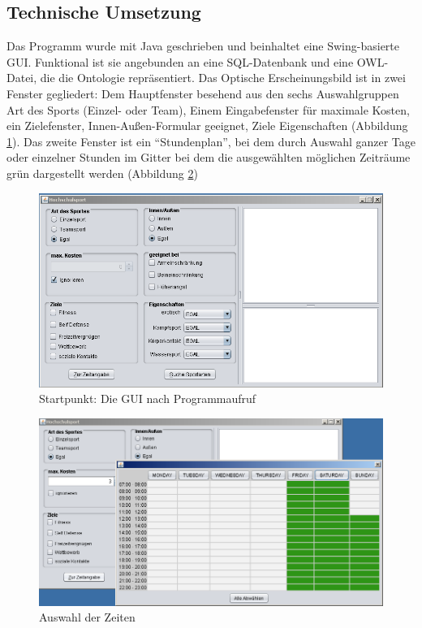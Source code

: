 \subsection{Technische Umsetzung}

Das Programm wurde mit Java geschrieben und beinhaltet eine Swing-basierte GUI. Funktional ist sie angebunden an eine SQL-Datenbank und eine OWL-Datei, die die Ontologie repräsentiert. Das Optische Erscheinungsbild ist in zwei Fenster gegliedert: Dem Hauptfenster besehend aus den sechs Auswahlgruppen Art des Sports (Einzel- oder Team), Einem Eingabefenster für maximale Kosten, ein Zielefenster, Innen-Außen-Formular geeignet, Ziele Eigenschaften (Abbildung \ref{GUI1}). Das zweite Fenster ist ein "`Stundenplan"', bei dem durch Auswahl ganzer Tage oder einzelner Stunden im Gitter bei dem die ausgewählten möglichen Zeiträume grün dargestellt werden (Abbildung \ref{GUI2})

\begin{figure}%
\includegraphics[width=150mm]{images/gui.png}%
\caption{Startpunkt: Die GUI nach Programmaufruf}%
\label{GUI1}%
\end{figure}

\begin{figure}%
\includegraphics[width=150mm]{images/guizeit.png}%
\caption{Auswahl der Zeiten}%
\label{GUI2}%
\end{figure}

